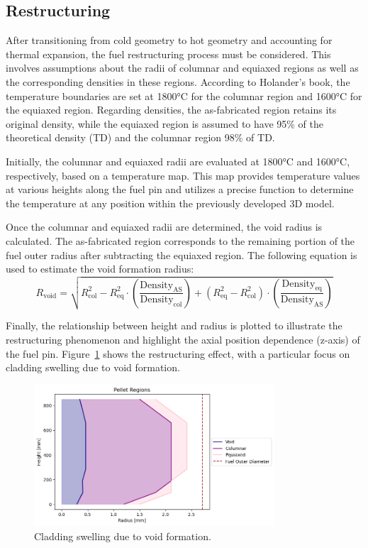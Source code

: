 \subsection{Restructuring}
After transitioning from cold geometry to hot geometry and accounting for thermal expansion, the fuel restructuring process must be considered. This involves assumptions about the radii of columnar and equiaxed regions as well as the corresponding densities in these regions. According to Holander’s book, the temperature boundaries are set at 1800°C for the columnar region and 1600°C for the equiaxed region. Regarding densities, the as-fabricated region retains its original density, while the equiaxed region is assumed to have 95\% of the theoretical density (TD) and the columnar region 98\% of TD.

Initially, the columnar and equiaxed radii are evaluated at 1800°C and 1600°C, respectively, based on a temperature map. This map provides temperature values at various heights along the fuel pin and utilizes a precise function to determine the temperature at any position within the previously developed 3D model.

Once the columnar and equiaxed radii are determined, the void radius is calculated. The as-fabricated region corresponds to the remaining portion of the fuel outer radius after subtracting the equiaxed region. The following equation is used to estimate the void formation radius:
\begin{equation}
R_{\text{void}} = \sqrt{
    R_{\text{col}}^2 - R_{\text{eq}}^2 \cdot \left( \frac{\text{Density}_{\text{AS}}}{\text{Density}_{\text{col}}} \right)
    + \left( R_{\text{eq}}^2 - R_{\text{col}}^2 \right) \cdot \left( \frac{\text{Density}_{\text{eq}}}{\text{Density}_{\text{AS}}} \right)
}
\end{equation}

Finally, the relationship between height and radius is plotted to illustrate the restructuring phenomenon and highlight the axial position dependence (z-axis) of the fuel pin. Figure~\ref{fig:restructuring} shows the restructuring effect, with a particular focus on cladding swelling due to void formation.

\begin{figure}[H]
\centering
\includegraphics[width=0.8\textwidth]{restructuring.png}
\caption{Cladding swelling due to void formation.}
\label{fig:restructuring}
\end{figure}

